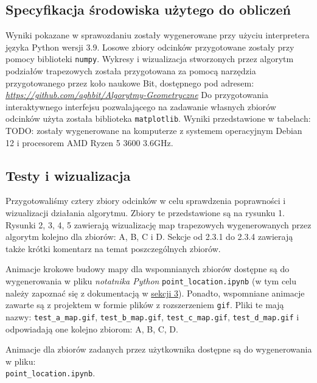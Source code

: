 \documentclass[11pt,a4paper]{article}
\begin{document}
\subsection{Specyfikacja środowiska użytego do obliczeń}
Wyniki pokazane w sprawozdaniu zostały wygenerowane przy
użyciu interpretera języka Python wersji 3.9. Losowe 
zbiory odcinków przygotowane zostały przy pomocy biblioteki
\verb|numpy|. Wykresy i wizualizacja stworzonych przez
algorytm podziałów trapezowych została przygotowana za
pomocą narzędzia przygotowanego przez koło naukowe Bit,
dostępnego pod adresem: 
\emph{\hyperlink{https://github.com/aghbit/Algorytmy-Geometryczne}
{https://github.com/aghbit/Algorytmy-Geometryczne}}
Do przygotowania interaktywnego interfejsu pozwalającego
na zadawanie własnych zbiorów odcinków użyta została
biblioteka \verb|matplotlib|.
Wyniki przedstawione w tabelach: TODO: zostały wygenerowane
na komputerze z systemem operacyjnym Debian 12 i procesorem
AMD Ryzen 5 3600 3.6GHz.

\subsection{Testy i wizualizacja}
Przygotowaliśmy cztery zbiory odcinków w celu sprawdzenia
poprawności i wizualizacji działania algorytmu. Zbiory te
przedstawione są na rysunku 1. Rysunki 2, 3, 4, 5 zawierają
wizualizację map trapezowych wygenerowanych przez algorytm
kolejno dla zbiorów: A, B, C i D. Sekcje od 2.3.1 do 2.3.4 %
zawierają także krótki komentarz na temat poszczególnych
zbiorów.

Animacje krokowe budowy mapy dla wspomnianych zbiorów
dostępne są do wygenerowania w pliku \textit{notatnika Python}
\verb|point_location.ipynb| (w tym celu należy zapoznać się
z dokumentacją w \hyperlink{section.3}{sekcji 3}).
Ponadto, wspomniane animacje zawarte są z projektem w formie
plików z rozszerzeniem \verb|gif|. Pliki te mają nazwy:
\verb|test_a_map.gif|, \verb|test_b_map.gif|,
\verb|test_c_map.gif|, \verb|test_d_map.gif|
i odpowiadają one kolejno zbiorom: A, B, C, D.

Animacje dla zbiorów zadanych przez użytkownika
dostępne są do wygenerowania w pliku: \\\verb|point_location.ipynb|.
\end{document}
